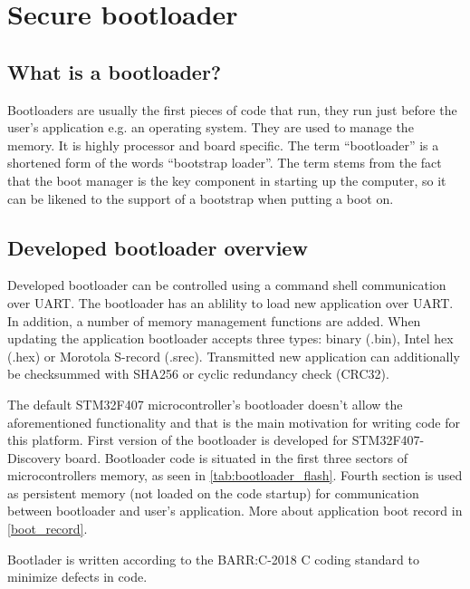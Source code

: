 \chapter{Secure bootloader}
\label{custom_bootloader}

\section{What is a bootloader?}

Bootloaders are usually the first pieces of code that run, they run just before the user's application e.g. an operating system. They are used to manage the memory. It is highly processor and board specific. The term “bootloader” is a shortened form of the words “bootstrap loader”. The term stems from the fact that the boot manager is the key component in starting up the computer, so it can be likened to the support of a bootstrap when putting a boot on.\citep{bootloader_intro}

\section{Developed bootloader overview}

Developed bootloader can be controlled using a command shell communication over UART. The bootloader has an ablility to load new application over UART. In addition, a number of memory management functions are added. When updating the application bootloader accepts three types: binary (.bin), Intel hex (.hex) or Morotola S-record (.srec). Transmitted new application can additionally be checksummed with SHA256 or cyclic redundancy check (CRC32).

The default STM32F407 microcontroller's bootloader doesn't allow the aforementioned functionality and that is the main motivation for writing code for this platform. \citep{stm32f407_ref_man} First version of the bootloader is developed for STM32F407-Discovery board. Bootloader code is situated in the first three sectors of microcontrollers memory, as seen in \autoref{tab:bootloader_flash}. Fourth section is used as persistent memory (not loaded on the code startup) for communication between bootloader and user's application. More about application boot record in \autoref{boot_record}. 

Bootlader is written according to the BARR:C-2018 C coding standard to minimize defects in code. \citep{barr_c}

